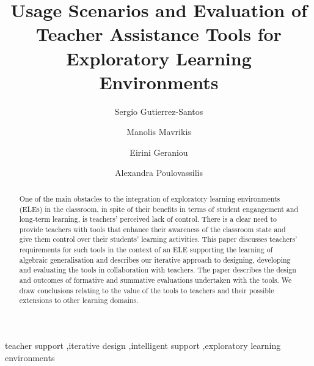 \documentclass[authoryear,preprint,12pt]{elsarticle}
\begin{document}
\begin{frontmatter}



\title{Usage Scenarios and Evaluation of Teacher Assistance Tools for Exploratory Learning Environments} 


\author[BBK]{Sergio Gutierrez-Santos}
\author[IoE]{Manolis Mavrikis}
\author[IoE]{Eirini Geraniou}
\author[BBK]{Alexandra Poulovassilis}

\address[BBK]{London Knowledge Lab, Birkbeck}
\address[IoE]{London Knowledge Lab, Institute of Education}

\begin{abstract}
One of the main obstacles to the integration of exploratory learning
environments (ELEs) in the classroom, in spite of their benefits in terms
of student engangement and long-term learning, is teachers' perceived lack
of control. There is a clear need to provide teachers
with tools that enhance their awareness of the classroom state and
give them control over their students' learning activities.
%
This paper discusses
teachers' requirements for such tools in the context of an ELE supporting 
the learning of algebraic generalisation and describes our iterative
approach to designing, developing and evaluating the tools in collaboration
with teachers. 
%
The paper describes the design and outcomes of formative and
summative evaluations undertaken with the tools. We draw
conclusions relating to the value of the tools to teachers and their
possible extensions to other learning domains.
\end{abstract}

\begin{keyword}
     teacher support 
\sep iterative design 
\sep intelligent support 
\sep exploratory learning environments
\end{keyword}

\end{frontmatter}
\end{document}
